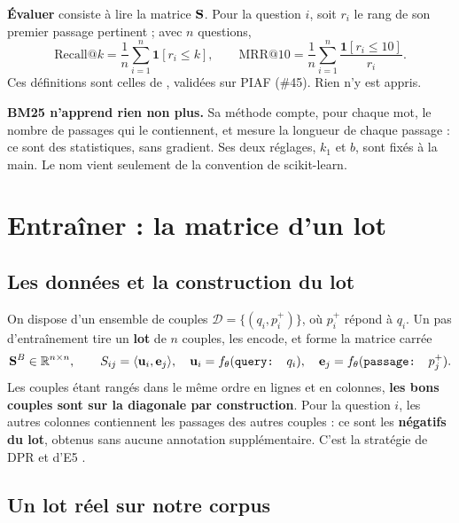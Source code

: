 \textbf{Évaluer} consiste à lire la matrice $\mathbf{S}$. Pour la question $i$, soit $r_i$ le rang de son premier
passage pertinent ; avec $n$ questions,
\[
  \text{Recall@}k = \frac{1}{n}\sum_{i=1}^{n} \mathbf{1}[r_i \le k],
  \qquad
  \text{MRR@10} = \frac{1}{n}\sum_{i=1}^{n} \frac{\mathbf{1}[r_i \le 10]}{r_i} .
\]
Ces définitions sont celles de , validées sur PIAF (\#45). Rien n'y est appris.

\textbf{BM25 n'apprend rien non plus.} Sa méthode  compte, pour chaque mot, le nombre de passages qui le
contiennent, et mesure la longueur de chaque passage : ce sont des statistiques, sans gradient. Ses deux réglages,
$k_1$ et $b$, sont fixés à la main. Le nom  vient seulement de la convention de scikit-learn.

\section{Entraîner : la matrice d'un lot}

\subsection{Les données et la construction du lot}

On dispose d'un ensemble de couples $\mathcal{D} = \{(q_i, p_i^{+})\}$, où $p_i^{+}$ répond à $q_i$. Un pas
d'entraînement tire un \textbf{lot} de $n$ couples, les encode, et forme la matrice carrée
\[
  \mathbf{S}^{B} \in \mathbb{R}^{n \times n}, \qquad S_{ij} = \langle \mathbf{u}_i, \mathbf{e}_j \rangle,
  \quad \mathbf{u}_i = f_\theta(\text{{\ttfamily query: }} q_i), \quad \mathbf{e}_j = f_\theta(\text{{\ttfamily passage: }} p_j^{+}) .
\]
Les couples étant rangés dans le même ordre en lignes et en colonnes, \textbf{les bons couples sont sur la
diagonale par construction}. Pour la question $i$, les autres colonnes contiennent les passages des autres couples :
ce sont les \textbf{négatifs du lot}, obtenus sans aucune annotation supplémentaire. C'est la stratégie de DPR et
d'E5 \source.

\subsection{Un lot réel sur notre corpus}\label{sec:lot}

